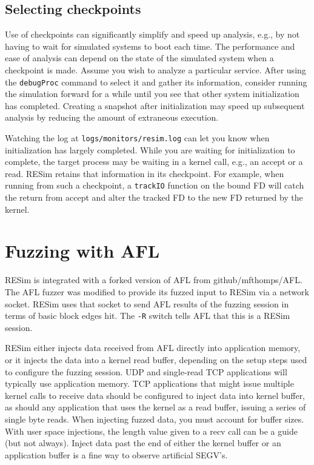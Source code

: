 \documentclass[titlepage]{article}
\begin{document}
\subsection{Selecting checkpoints}
Use of checkpoints can significantly simplify and speed up analysis, e.g., by not having to wait for simulated systems to boot each time.
The performance and ease of analysis can depend on the state of the simulated system when a checkpoint is made.  Assume you wish to analyze 
a particular service. After using the {\tt debugProc} command to select it and gather its information, consider running the simulation
forward for a while until you see that other system initialization has completed.  Creating a snapshot after initialization may speed up
subsequent analysis by reducing the amount of extraneous execution.  

Watching the log at {\tt logs/monitors/resim.log} can let you know when initialization has largely completed.
While you are waiting for initialization to complete, the target process may be waiting in a kernel call, e.g., an accept or a read.
RESim retains that information in its checkpoint.  For example, when running from such a checkpoint, a {\tt trackIO} function on the bound FD 
will catch the return from accept and alter the tracked FD to the new FD returned by the kernel.

\section{Fuzzing with AFL}
\label{fuzz}
RESim is integrated with a forked version of AFL from github/mfthomps/AFL.
The AFL fuzzer was modified to provide its fuzzed input to RESim via a
network socket.  RESim uses that socket to send AFL results of the fuzzing
session in terms of basic block edges hit.  The {\tt -R} switch tells AFL
that this is a RESim session.

RESim either injects data received from AFL directly into application memory, or it injects the data into
a kernel read buffer, depending on the setup steps used to configure the fuzzing session.  UDP and single-read TCP applications
will typically use application memory.  TCP applications that might issue multiple kernel calls to receive
data should be configured to inject data into kernel buffer, as should any application that uses the kernel as a read buffer, issuing
a series of single byte reads.  When injecting fuzzed data, you must account for buffer sizes.  With user space injections, the length value
given to a recv call can be a guide (but not always).  Inject data past the end of either the kernel buffer or an application buffer is a fine
way to observe artificial SEGV's.
\end{document}
